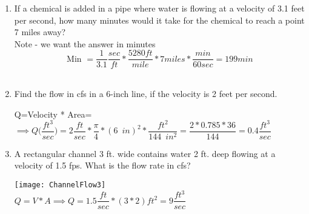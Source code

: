 \begin{enumerate}[1.]

\item If a chemical is added in a pipe where water is flowing at a velocity of 3.1 feet per second, how many minutes would it take for the chemical to reach a point 7 miles away?  \\

Note - we want the answer in minutes\\

$$\textrm{Min } = \dfrac{1}{3.1}\dfrac{sec}{ft}*\dfrac{5280ft}{mile}*7 miles*\dfrac{min}{60 sec} = \boxed{199 min}$$
\\

\item Find the flow in cfs in a 6-inch line, if the velocity is 2 feet per second.

Q=Velocity * Area=$\implies Q \big(\dfrac{ft^3}{sec}\big)=2 \dfrac{ft}{sec} * \dfrac{\pi}{4}*(6 \enspace in)^2*\dfrac{ft^2}{144 \enspace in^2}=\dfrac{2*0.785*36}{144}=\boxed{0.4 \dfrac{ft^3}{sec}} $\\
\vspace{0.2cm}

\item A rectangular channel 3 ft. wide contains water 2 ft. deep flowing at a velocity of 1.5 fps.
What is the flow rate in cfs?

\texttt{[image: ChannelFlow3]}\\
$Q=V*A \implies Q = 1.5 \dfrac{ft}{sec}*(3*2)ft^2=\boxed{9\dfrac{ft^3}{sec}}$

\end{enumerate}
